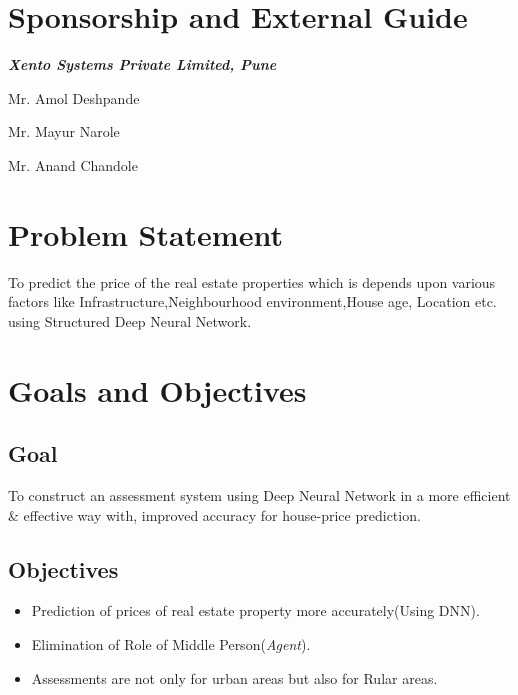 \documentclass[11pt,fleqn]{book} %
\begin{document}
\section{Sponsorship and External Guide}
\textbf{\LARGE\color{ocre}\textit{Xento Systems Private Limited, Pune}}
    \item Mr. Amol Deshpande
    \item Mr. Mayur Narole
    \item Mr. Anand Chandole
    
    
    
\section{Problem Statement}
\label{sec:problem}
To predict the price of the real estate properties which is depends upon various factors like Infrastructure,Neighbourhood environment,House age, Location etc. using Structured Deep Neural Network.

\section{Goals and Objectives}
\subsection{Goal}
	\item To construct an assessment system using Deep Neural Network in a more efficient & effective way with, improved accuracy for house-price prediction.

\subsection{Objectives}
	\begin{itemize}
	\item Prediction of prices of real estate property more accurately(Using DNN).
	\item Elimination of Role of Middle Person(\emph{Agent}).
	\item Assessments are not only for urban areas but also for Rular areas.
\end{itemize}



\end{document}
